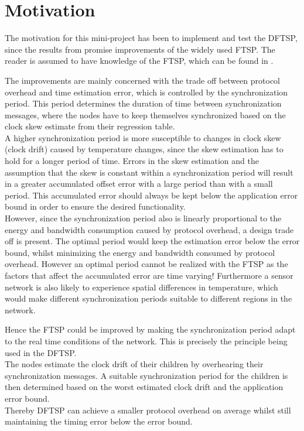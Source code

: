 \documentclass[Main]{subfiles}
\begin{document}
\section{Motivation} %
\label{sec:motivation}

	The motivation for this mini-project has been to implement and test the DFTSP, since the results from \cite{dynamicFTSParticle} promise improvements of the widely used FTSP. 
	The reader is assumed to have knowledge of the FTSP, which can be found in \cite{FTSParticle}. 

	The improvements are mainly concerned with the trade off between protocol overhead and time estimation error, which is controlled by the synchronization period.
	This period determines the duration of time between synchronization messages, where the nodes have to keep themselves synchronized based on the clock skew estimate from their regression table.
	\\A higher synchronization period is more susceptible to changes in clock skew (clock drift) caused by temperature changes, since the skew estimation has to hold for a longer period of time. 
	Errors in the skew estimation and the assumption that the skew is constant within a synchronization period will result in a greater accumulated offset error with a large period than with a small period. 
	This accumulated error should always be kept below the application error bound in order to ensure the desired functionality. 
	\\However, since the synchronization period also is linearly proportional to the energy and bandwidth consumption caused by protocol overhead, a design trade off is present.
	The optimal period would keep the estimation error below the error bound, whilst minimizing the energy and bandwidth consumed by protocol overhead.
	However an optimal period cannot be realized with the FTSP as the factors that affect the accumulated error are time varying! 
	Furthermore a sensor network is also likely to experience spatial differences in temperature, which would make different synchronization periods suitable to different regions in the network.

	Hence the FTSP could be improved by making the synchronization period adapt to the real time conditions of the network. 
	This is precisely the principle being used in the DFTSP. 
	\\The nodes estimate the clock drift of their children by overhearing their synchronization messages.
	A suitable synchronization period for the children is then determined based on the worst estimated clock drift and the application error bound.
	\\Thereby DFTSP can achieve a smaller protocol overhead on average whilst still maintaining the timing error below the error bound.  


\end{document}
